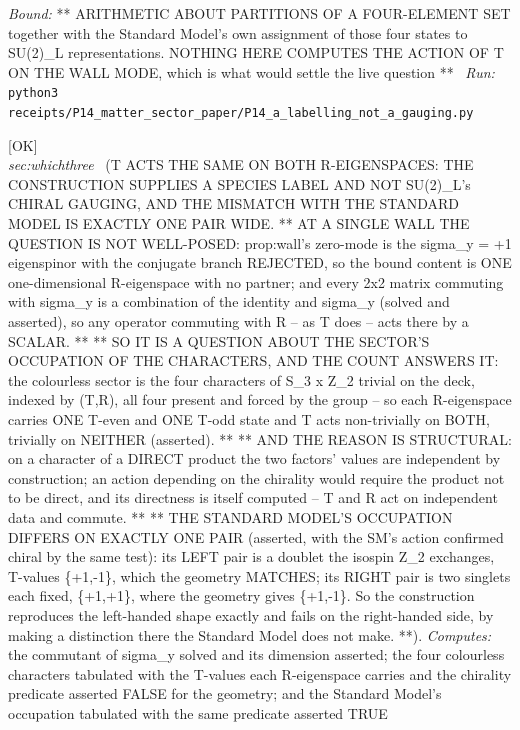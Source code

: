 \begin{description}
 \emph{Bound:} ** ARITHMETIC ABOUT PARTITIONS OF A FOUR-ELEMENT SET together with the Standard Model's own assignment of those four states to SU(2)\_L representations. NOTHING HERE COMPUTES THE ACTION OF T ON THE WALL MODE, which is what would settle the live question **
\ \emph{Run:} \texttt{python3 receipts/P14\_matter\_sector\_paper/P14\_a\_labelling\_not\_a\_gauging.py}
\item[\rcptlabel{P14_the_species_bit_is_not_chiral}{P14R40}\textbf{P14R40}\quad\texttt{P14\_the\_species\_bit\_is\_not\_chiral}]\hfill\textsf{[OK]}\\
\textit{sec:whichthree} \ (T ACTS THE SAME ON BOTH R-EIGENSPACES: THE CONSTRUCTION SUPPLIES A SPECIES LABEL AND NOT SU(2)\_L's CHIRAL GAUGING, AND THE MISMATCH WITH THE STANDARD MODEL IS EXACTLY ONE PAIR WIDE. ** AT A SINGLE WALL THE QUESTION IS NOT WELL-POSED: prop:wall's zero-mode is the sigma\_y = +1 eigenspinor with the conjugate branch REJECTED, so the bound content is ONE one-dimensional R-eigenspace with no partner; and every 2x2 matrix commuting with sigma\_y is a combination of the identity and sigma\_y (solved and asserted), so any operator commuting with R -- as T does -- acts there by a SCALAR. ** ** SO IT IS A QUESTION ABOUT THE SECTOR'S OCCUPATION OF THE CHARACTERS, AND THE COUNT ANSWERS IT: the colourless sector is the four characters of S\_3 x Z\_2 trivial on the deck, indexed by (T,R), all four present and forced by the group -- so each R-eigenspace carries ONE T-even and ONE T-odd state and T acts non-trivially on BOTH, trivially on NEITHER (asserted). ** ** AND THE REASON IS STRUCTURAL: on a character of a DIRECT product the two factors' values are independent by construction; an action depending on the chirality would require the product not to be direct, and its directness is itself computed -- T and R act on independent data and commute. ** ** THE STANDARD MODEL'S OCCUPATION DIFFERS ON EXACTLY ONE PAIR (asserted, with the SM's action confirmed chiral by the same test): its LEFT pair is a doublet the isospin Z\_2 exchanges, T-values \{+1,-1\}, which the geometry MATCHES; its RIGHT pair is two singlets each fixed, \{+1,+1\}, where the geometry gives \{+1,-1\}. So the construction reproduces the left-handed shape exactly and fails on the right-handed side, by making a distinction there the Standard Model does not make. **). 
\emph{Computes:} the commutant of sigma\_y solved and its dimension asserted; the four colourless characters tabulated with the T-values each R-eigenspace carries and the chirality predicate asserted FALSE for the geometry; and the Standard Model's occupation tabulated with the same predicate asserted TRUE

\end{description}
